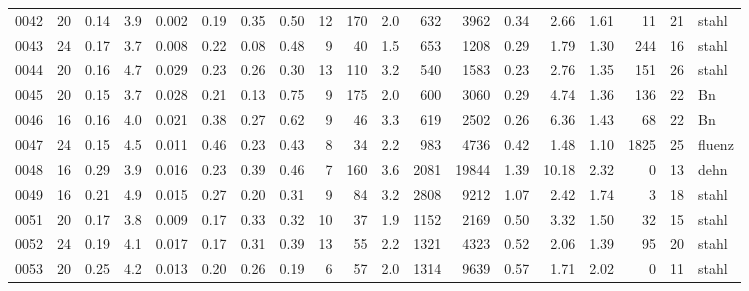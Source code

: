 {\begin{longtable}{@{}lrrrrrrrrrrrrrrrrrl@{}}
0042 & 20 & \num{0.14} & \num{3.9} & \num{0.002} & \num{0.19} & \num{0.35} & \num{0.50} & 12 & \num{170} & \num{2.0} & \num{632} & \num{3962} & \num{0.34} & \num{2.66} & \num{1.61} & \num{11} & \num{21} & stahl \\
0043 & 24 & \num{0.17} & \num{3.7} & \num{0.008} & \num{0.22} & \num{0.08} & \num{0.48} & 9 & \num{40} & \num{1.5} & \num{653} & \num{1208} & \num{0.29} & \num{1.79} & \num{1.30} & \num{244} & \num{16} & stahl \\
0044 & 20 & \num{0.16} & \num{4.7} & \num{0.029} & \num{0.23} & \num{0.26} & \num{0.30} & 13 & \num{110} & \num{3.2} & \num{540} & \num{1583} & \num{0.23} & \num{2.76} & \num{1.35} & \num{151} & \num{26} & stahl \\
0045 & 20 & \num{0.15} & \num{3.7} & \num{0.028} & \num{0.21} & \num{0.13} & \num{0.75} & 9 & \num{175} & \num{2.0} & \num{600} & \num{3060} & \num{0.29} & \num{4.74} & \num{1.36} & \num{136} & \num{22} & Bn \\
0046 & 16 & \num{0.16} & \num{4.0} & \num{0.021} & \num{0.38} & \num{0.27} & \num{0.62} & 9 & \num{46} & \num{3.3} & \num{619} & \num{2502} & \num{0.26} & \num{6.36} & \num{1.43} & \num{68} & \num{22} & Bn \\
0047 & 24 & \num{0.15} & \num{4.5} & \num{0.011} & \num{0.46} & \num{0.23} & \num{0.43} & 8 & \num{34} & \num{2.2} & \num{983} & \num{4736} & \num{0.42} & \num{1.48} & \num{1.10} & \num{1825} & \num{25} & fluenz \\
0048 & 16 & \num{0.29} & \num{3.9} & \num{0.016} & \num{0.23} & \num{0.39} & \num{0.46} & 7 & \num{160} & \num{3.6} & \num{2081} & \num{19844} & \num{1.39} & \num{10.18} & \num{2.32} & \num{0} & \num{13} & dehn \\
0049 & 16 & \num{0.21} & \num{4.9} & \num{0.015} & \num{0.27} & \num{0.20} & \num{0.31} & 9 & \num{84} & \num{3.2} & \num{2808} & \num{9212} & \num{1.07} & \num{2.42} & \num{1.74} & \num{3} & \num{18} & stahl \\
0051 & 20 & \num{0.17} & \num{3.8} & \num{0.009} & \num{0.17} & \num{0.33} & \num{0.32} & 10 & \num{37} & \num{1.9} & \num{1152} & \num{2169} & \num{0.50} & \num{3.32} & \num{1.50} & \num{32} & \num{15} & stahl \\
0052 & 24 & \num{0.19} & \num{4.1} & \num{0.017} & \num{0.17} & \num{0.31} & \num{0.39} & 13 & \num{55} & \num{2.2} & \num{1321} & \num{4323} & \num{0.52} & \num{2.06} & \num{1.39} & \num{95} & \num{20} & stahl \\
0053 & 20 & \num{0.25} & \num{4.2} & \num{0.013} & \num{0.20} & \num{0.26} & \num{0.19} & 6 & \num{57} & \num{2.0} & \num{1314} & \num{9639} & \num{0.57} & \num{1.71} & \num{2.02} & \num{0} & \num{11} & stahl \\

\end{longtable}}
